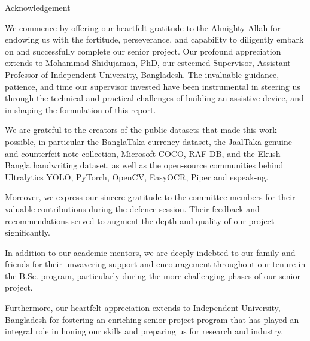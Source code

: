 \clearpage
\begin{center}
    {\headingfont\LARGE Acknowledgement}
\end{center}
\vspace{1.5cm}
\par

We commence by offering our heartfelt gratitude to the Almighty Allah for endowing us with the fortitude, perseverance, and capability to diligently embark on and successfully complete our senior project. Our profound appreciation extends to Mohammad Shidujaman, PhD, our esteemed Supervisor, Assistant Professor of Independent University, Bangladesh. The invaluable guidance, patience, and time our supervisor invested have been instrumental in steering us through the technical and practical challenges of building an assistive device, and in shaping the formulation of this report.
\vspace{0.5cm}

\par
We are grateful to the creators of the public datasets that made this work possible, in particular the BanglaTaka currency dataset, the JaalTaka genuine and counterfeit note collection, Microsoft COCO, RAF-DB, and the Ekush Bangla handwriting dataset, as well as the open-source communities behind Ultralytics YOLO, PyTorch, OpenCV, EasyOCR, Piper and espeak-ng.
\vspace{0.5cm}

\par
Moreover, we express our sincere gratitude to the committee members for their valuable contributions during the defence session. Their feedback and recommendations served to augment the depth and quality of our project significantly.
\vspace{0.5cm}

\par
In addition to our academic mentors, we are deeply indebted to our family and friends for their unwavering support and encouragement throughout our tenure in the B.Sc. program, particularly during the more challenging phases of our senior project.
\vspace{0.5cm}

\par
Furthermore, our heartfelt appreciation extends to Independent University, Bangladesh for fostering an enriching senior project program that has played an integral role in honing our skills and preparing us for research and industry.
